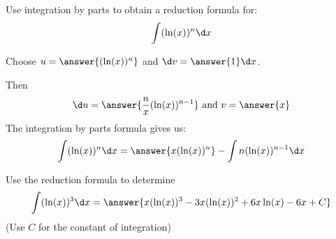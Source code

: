 \documentclass{ximera}
\author{Jason Miller}
\begin{document}
\begin{exercise}

Use integration by parts to obtain a reduction formula for:
\[
\int (\ln(x))^{n} \d x
\]


Choose $u=\answer{( \ln(x) )^{n} }$ and $\d v=\answer{1} \d x$.

Then
\[ \d u=\answer{\frac{n}{x}( \ln(x) )^{n-1}} \textrm{  and  } v=\answer{x}
\]
The integration by parts formula gives us:
\[
\int ( \ln(x) )^{n} \d x=\answer{x (\ln(x))^{n}} -  \int n (\ln(x))^{n-1} \d x
\]

Use the reduction formula to determine 
\[
\int ( \ln(x))^{3} \d x=\answer{x(\ln(x))^{3} -3x (\ln(x))^{2} + 6x \ln(x) -6x +C }
\]
(Use $C$ for the constant of integration)

\end{exercise}
\end{document}

